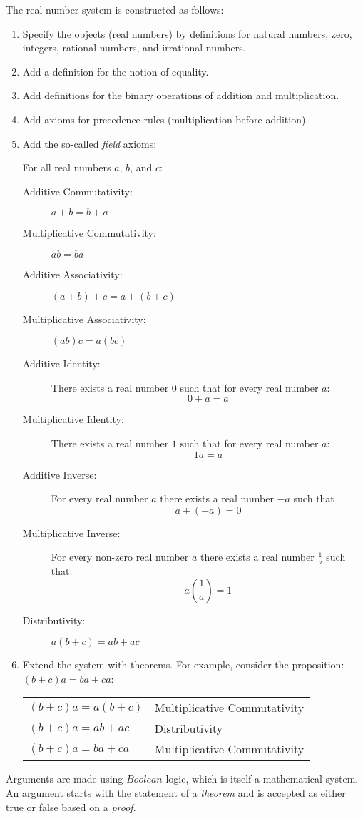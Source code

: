 \documentclass[letterpaper,12pt,fleqn]{article}
\begin{document}
\begin{example}
  The real number system is constructed as follows:
  \begin{enumerate}
    \item Specify the objects (real numbers) by definitions for natural numbers, zero, integers,
      rational numbers, and irrational numbers.
    \item Add a definition for the notion of equality.
    \item Add definitions for the binary operations of addition and multiplication.
    \item Add axioms for precedence rules (multiplication before addition).
    \item Add the so-called \emph{field} axioms:

      For all real numbers \(a\), \(b\), and \(c\):
      \begin{description}
      \item[Additive Commutativity:] \(a+b=b+a\)
      \item[Multiplicative Commutativity:] \(ab=ba\)
      \item[Additive Associativity:] \((a+b)+c=a+(b+c)\)
      \item[Multiplicative Associativity:] \((ab)c=a(bc)\)
      \item[Additive Identity:] There exists a real number \(0\) such that for every real number \(a\):
        \[0+a=a\]
      \item[Multiplicative Identity:] There exists a real number \(1\) such that for every real number \(a\):
        \[1a=a\]
      \item[Additive Inverse:] For every real number \(a\) there exists a real number \(-a\) such that
        \[a+(-a)=0\]
      \item[Multiplicative Inverse:] For every non-zero real number \(a\) there exists a real number \(\frac{1}{a}\)
        such that:
        \[a\left(\frac{1}{a}\right)=1\]
      \item[Distributivity:] \(a(b+c)=ab+ac\)
      \end{description}
    \item Extend the system with theorems.  For example, consider the proposition: \((b+c)a=ba+ca\):

      \begin{tabular}{ll}
        \((b+c)a=a(b+c)\) & Multiplicative Commutativity \\
        \((b+c)a=ab+ac\) & Distributivity \\
        \((b+c)a=ba+ca\) & Multiplicative Commutativity \\
      \end{tabular}
  \end{enumerate}
\end{example}

Arguments are made using \(Boolean\) logic, which is itself a mathematical system.  An argument starts with the
statement of a \emph{theorem} and is accepted as either true or false based on a \emph{proof}.
\end{document}
